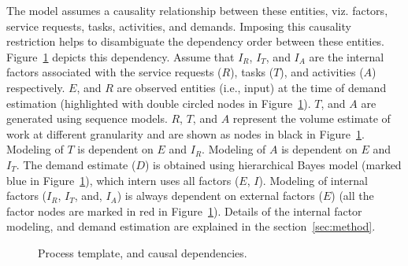 \documentclass[twoside,leqno,twocolumn]{article}
\begin{document}
The model assumes a causality relationship between these entities, viz. factors, service requests, tasks, activities, and demands. Imposing this causality restriction helps to disambiguate the dependency order between these entities. Figure~\ref{fig:ontology} depicts this dependency. Assume that $I_R$, $I_T$, and $I_A$ are the internal factors associated with the service requests ($R$), tasks ($T$), and activities ($A$) respectively. $E$, and $R$ are observed entities (i.e., input) at the time of demand estimation (highlighted with double circled nodes in Figure~\ref{fig:ontology}). $T$, and $A$ are generated using sequence models. $R$, $T$, and $A$ represent the volume estimate of work at different granularity and are shown as nodes in black in Figure~\ref{fig:ontology}.  Modeling of $T$ is dependent on $E$ and $I_R$. Modeling of $A$ is dependent on $E$ and $I_T$. The demand estimate ($D$) is obtained using hierarchical Bayes model (marked blue in Figure~\ref{fig:ontology}), which intern uses all factors ($E$, $I$). Modeling of internal factors ($I_R$, $I_T$, and, $I_A$) is always dependent on external factors ($E$) (all the factor nodes are marked in red in Figure~\ref{fig:ontology}). Details of the internal factor modeling, and demand estimation are explained in the section~\ref{sec:method}. 

\begin{figure}[t]
	\centering
	\caption{Process template, and causal dependencies.}
    \label{fig:ontology}
\end{figure}
\end{document}
